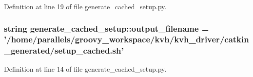 \-Definition at line 19 of file generate\-\_\-cached\-\_\-setup.\-py.

\subsubsection[{output\-\_\-filename}]{\setlength{\rightskip}{0pt plus 5cm}string {\bf generate\-\_\-cached\-\_\-setup\-::output\-\_\-filename} = '/home/parallels/groovy\-\_\-workspace/kvh/kvh\-\_\-driver/catkin\-\_\-generated/setup\-\_\-cached.\-sh'}\label{namespacegenerate__cached__setup_ab8af5b5c03c4c054bff5d246d632a5d8}


\-Definition at line 14 of file generate\-\_\-cached\-\_\-setup.\-py.

